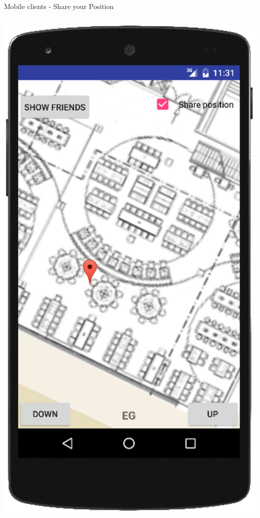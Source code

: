 \documentclass[11pt]{beamer}
\begin{document}
\begin{frame}{Mobile clients - Share your Position}
\begin{columns}[T]
	\begin{column}{.4\textwidth}
	\includegraphics[scale=0.27]{android_pinpoint}
	\end{column}
\end{columns}

\end{frame}
\end{document}
